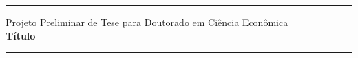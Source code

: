 \documentclass[
12pt,				%
openright,			%
oneside,			%
a4paper,		%
english,			%
brazil,				%
]{article}
\begin{document}
\begin{center}
\rule{\textwidth}{1.2pt}
	Projeto Preliminar de Tese para Doutorado em Ciência Econômica\\
	\textbf{Título}
\rule{\textwidth}{1.2pt}
\end{center}
\begin{comment}
Habilitar caso seja necessário um abstract em outra página

\Abstract{
teste in english
}
\end{comment}

\sectionfont{\scshape}

\doublespacing
\begingroup
\let\clearpage\relax




\endgroup
\end{document}
